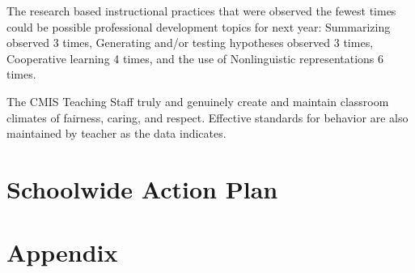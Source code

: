 \documentclass{report}
\begin{document}
\begin{findings}

The research based instructional practices that were observed the fewest times could be possible professional development topics for next year: 
Summarizing observed 3 times, Generating and/or testing hypotheses observed 3 times, Cooperative learning 4 times, and the use of  Nonlinguistic representations 6 times. 


The CMIS Teaching Staff truly and genuinely create and maintain classroom climates of fairness, caring, and respect. Effective standards for behavior are also maintained by teacher as the data indicates. 



\end{findings}
\chapter{Schoolwide Action Plan}
\chapter{Appendix}
\listoffigures
\listoftables
\end{document}
